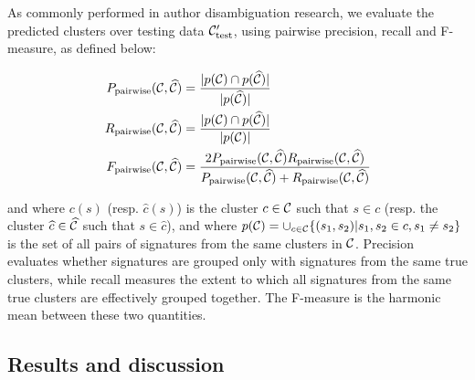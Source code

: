 \documentclass[conference]{IEEEtran}
\begin{document}
As commonly performed in author disambiguation research,
we evaluate the predicted clusters over testing data  ${\cal C}_\text{test}^\prime$,
using pairwise precision, recall
and F-measure, as defined below:

\begin{align}
P_\text{pairwise}({\cal C}, \widehat{\cal C}) &= \frac{|p({\cal C}) \cap p(\widehat{\cal C})|}{|p(\widehat{\cal C})|}\\
R_\text{pairwise}({\cal C}, \widehat{\cal C}) &= \frac{|p({\cal C}) \cap p(\widehat{\cal C})|}{|p({\cal C})|}\\
F_\text{pairwise}({\cal C}, \widehat{\cal C}) &= \frac{2 P_\text{pairwise}({\cal C}, \widehat{\cal C}) R_\text{pairwise}({\cal C}, \widehat{\cal C})}{P_\text{pairwise}({\cal C}, \widehat{\cal C}) + R_\text{pairwise}({\cal C}, \widehat{\cal C})}
\end{align}

and where $c(s)$ (resp. $\widehat{c}(s)$) is the cluster $c \in {\cal C}$ such that
$s \in c$ (resp. the cluster $\widehat{c} \in \widehat{\cal C}$ such that $s
\in \widehat{c}$), and where $p({\cal C}) = \cup_{c \in {\cal C}} \{ (s_1, s_2)
| s_1, s_2 \in c, s_1 \neq s_2 \}$ is the set of all pairs of signatures from
the same clusters in ${\cal C}$.
Precision evaluates whether signatures are grouped only with signatures from the same true clusters,
while recall measures the extent to which all signatures from the same true clusters are
effectively grouped together.
The F-measure is the harmonic mean between these two quantities.

\subsection{Results and discussion}
\end{document}
